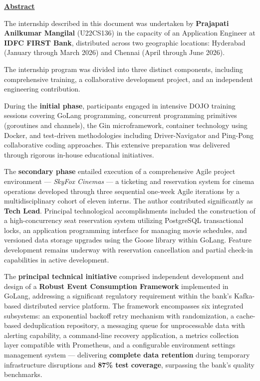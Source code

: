 \newpage
\begin{center}
  \textbf{\Huge \underline{Abstract}} \\[1.5cm]
\end{center}

The internship described in this document was undertaken by \textbf{Prajapati Anilkumar Mangilal}
(U22CS136) in the capacity of an Application Engineer at \textbf{IDFC FIRST Bank}, distributed across 
two geographic locations: Hyderabad (January through March 2026) and Chennai (April through June 2026).

The internship program was divided into three distinct components, including comprehensive training, 
a collaborative development project, and an independent engineering contribution.

During the \textbf{initial phase}, participants engaged in intensive DOJO training sessions covering 
GoLang programming, concurrent programming primitives (goroutines and channels), the Gin 
microframework, container technology using Docker, and test-driven methodologies including Driver-Navigator 
and Ping-Pong collaborative coding approaches. This extensive preparation was delivered through 
rigorous in-house educational initiatives.

The \textbf{secondary phase} entailed execution of a comprehensive Agile project environment --- 
\textit{SkyFox Cinemas} --- a ticketing and reservation system for cinema operations developed through 
three sequential one-week Agile iterations by a multidisciplinary cohort of eleven interns. The author 
contributed significantly as \textbf{Tech Lead}. Principal technological accomplishments included the 
construction of a high-concurrency seat reservation system utilizing PostgreSQL transactional locks, 
an application programming interface for managing movie schedules, and versioned data storage upgrades 
using the Goose library within GoLang. Feature development remains underway with reservation cancellation 
and partial check-in capabilities in active development.

The \textbf{principal technical initiative} comprised independent development and design of a 
\textbf{Robust Event Consumption Framework} implemented in GoLang, addressing a significant 
regulatory requirement within the bank's Kafka-based distributed service platform. The framework 
encompasses six integrated subsystems: an exponential backoff retry mechanism with randomization, 
a cache-based deduplication repository, a messaging queue for unprocessable data with alerting capability, 
a command-line recovery application, a metrics collection layer compatible with Prometheus, and a 
configurable environment settings management system --- delivering \textbf{complete data retention} 
during temporary infrastructure disruptions and \textbf{87\% test coverage}, surpassing the bank's 
quality benchmarks.
